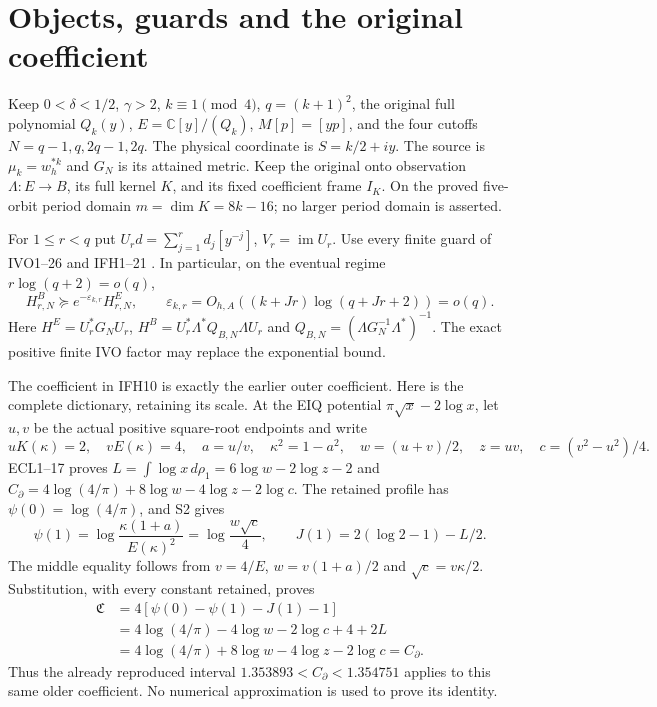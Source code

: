 \documentclass[11pt]{article}
\begin{document}
\section{Objects, guards and the original coefficient}
Keep $0<\delta<1/2$, $\gamma>2$, $k\equiv1\pmod4$,
$q=(k+1)^2$, the original full polynomial $Q_k(y)$,
$E=\mathbb C[y]/(Q_k)$, $M[p]=[yp]$, and the four cutoffs
$N=q-1,q,2q-1,2q$. The physical coordinate is $S=k/2+iy$.
The source is $\mu_k=w_h^{*k}$ and $G_N$ is its attained metric.
Keep the original onto observation $\Lambda:E\to B$, its full kernel
$K$, and its fixed coefficient frame $I_K$. On the proved five-orbit
period domain $m=\dim K=8k-16$; no larger period domain is asserted.

For $1\le r<q$ put $U_rd=\sum_{j=1}^rd_j[y^{-j}]$, $V_r=\operatorname{im}U_r$.
Use every finite guard of IVO1--26 and IFH1--21 \cite{IFH,IVO}.
In particular, on the eventual regime $r\log(q+2)=o(q)$,
\[
H^B_{r,N}\succeq e^{-\varepsilon_{k,r}}H^E_{r,N},\qquad
\varepsilon_{k,r}=O_{h,A}((k+Jr)\log(q+Jr+2))=o(q).
\tag{IQR1}
\]
Here $H^E=U_r^*G_NU_r$, $H^B=U_r^*\Lambda^*Q_{B,N}\Lambda U_r$
and $Q_{B,N}=(\Lambda G_N^{-1}\Lambda^*)^{-1}$.
The exact positive finite IVO factor may replace the exponential bound.

The coefficient in IFH10 is exactly the earlier outer coefficient.
Here is the complete dictionary, retaining its scale.
At the EIQ potential $\pi\sqrt x-2\log x$, let $u,v$ be the actual
positive square-root endpoints and write
\[
uK(\kappa)=2,\quad vE(\kappa)=4,\quad a=u/v,\quad
\kappa^2=1-a^2,\quad w=(u+v)/2,\quad z=uv,\quad c=(v^2-u^2)/4.
\]
ECL1--17 \cite{ECL} proves
$L=\int\log x\,d\rho_1=6\log w-2\log z-2$ and
$C_\partial=4\log(4/\pi)+8\log w-4\log z-2\log c$.
The retained profile has $\psi(0)=\log(4/\pi)$, and S2 gives
\[
\psi(1)=\log\frac{\kappa(1+a)}{E(\kappa)^2}
       =\log\frac{w\sqrt c}{4},\qquad
J(1)=2(\log2-1)-L/2.
\]
The middle equality follows from $v=4/E$, $w=v(1+a)/2$ and
$\sqrt c=v\kappa/2$. Substitution, with every constant retained, proves
\[
\begin{split}
\mathfrak C&=4[\psi(0)-\psi(1)-J(1)-1]\\
 &=4\log(4/\pi)-4\log w-2\log c+4+2L\\
 &=4\log(4/\pi)+8\log w-4\log z-2\log c=C_\partial .
\end{split}\tag{IQR2}
\]
Thus the already reproduced interval
$1.353893<C_\partial<1.354751$ applies to this same older coefficient.
No numerical approximation is used to prove its identity.
\end{document}
